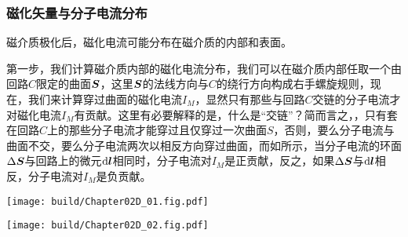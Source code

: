 \subsubsection{磁化矢量与分子电流分布}
磁介质极化后，磁化电流可能分布在磁介质的内部和表面。

第一步，我们计算磁介质内部的磁化电流分布，我们可以在磁介质内部任取一个由回路$C$限定的曲面$\vb*{S}$，这里$\vb*{S}$的法线方向与$C$的绕行方向构成右手螺旋规则，现在，我们来计算穿过曲面的磁化电流$I_M$，显然只有那些与回路$C$交链的分子电流才对磁化电流$I_M$有贡献。这里有必要解释的是，什么是“交链”？简而言之，，只有套在回路$C$上的那些分子电流才能穿过且仅穿过一次曲面$S$，否则，要么分子电流与曲面不交，要么分子电流两次以相反方向穿过曲面，而如所示，当分子电流的环面$\Delta{\vb*{S}}$与回路上的微元$\dd{\vb*{l}}$相同时，分子电流对$I_M$是正贡献，反之，如果$\Delta\vb*{S}$与$\dd{\vb*{l}}$相反，分子电流对$I_M$是负贡献。

\begin{Figure}[回路与分子电流的交链]
    \begin{FigureSub}[方向相同]
        \texttt{[image: build/Chapter02D\_01.fig.pdf]}
    \end{FigureSub}\hspace{1.5cm}
    \begin{FigureSub}[方向相反]
        \texttt{[image: build/Chapter02D\_02.fig.pdf]}
    \end{FigureSub}
\end{Figure}

